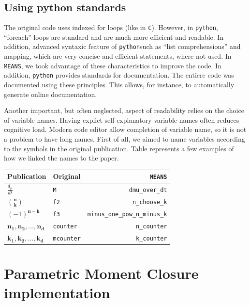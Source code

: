 \documentclass[11pt,a4paper]{article}
\newcommand{\means}{\texttt{MEANS}}
\newcommand{\py}{\texttt{python}}
\begin{document}
\subsection{Using python standards}

The original code uses indexed for loops (like in \texttt{C}).
However, in \py, ``foreach'' loops are  standard and are much more efficient and readable.
In addition, advanced syntaxic feature of \py such as ``list comprehensions''  and mapping,
which are very concise and efficient statements, where not used.
In \means, we took advantage of these characteristics to improve the code.
In addition, \py{} provides standards for documentation. 
The entiere code was documented using these principles. 
This allows, for instance, to automatically generate online documentation.

Another important, but often neglected, aspect of readability relies on the choice of variable names.
Having explict self explanatory variable names often reduces cognitive load.
Modern code editor allow completion of variable name, so it is not a problem to have long names.
First of all, we aimed to name variables according to the symbols in the original publication\cite{ale_general_2013}.
Table 
represents a few examples of how we linked the names to the paper.
\begin{table}
	\begin{center}
	\begin{tabular}{ | l | l | r|}

\hline
\bf{Publication\cite{ale_general_2013}} & \bf{Original} & \bf{\means}\\
\hline
\hline
$\frac{d_{\mu}}{dt}$ & \verb"M" & \verb"dmu_over_dt"\\
\hline
$\mathbf{n\choose{k}}$ & \verb"f2" & \verb"n_choose_k"\\
\hline
$ (-1)^\mathbf{{n-k}}$ & \verb"f3" & \verb"minus_one_pow_n_minus_k"\\
\hline
$\mathbf{n_1	, n_2, ..., n_d}$ & \verb"counter" & \verb"n_counter"\\
\hline
$\mathbf{k_1, k_2, ..., k_d}$ & \verb"mcounter" & \verb"k_counter"\\
\hline
\end{tabular}
\end{center}
\end{table}


\section{Parametric Moment Closure implementation}
\end{document}
